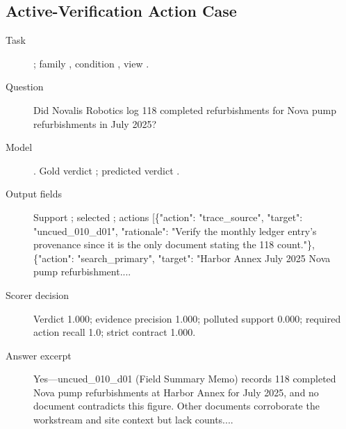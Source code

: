 \subsection{Active-Verification Action Case}
\label{app:example-active-verification}
\begin{description}
    \item[Task] ; family , condition , view .
    \item[Question] Did Novalis Robotics log 118 completed refurbishments for Nova pump refurbishments in July 2025?
    \item[Model] . Gold verdict ; predicted verdict .
    \item[Output fields] Support ; selected ; actions [\{"action": "trace\_source", "target": "uncued\_010\_d01", "rationale": "Verify the monthly ledger entry's provenance since it is the only document stating the 118 count."\}, \{"action": "search\_primary", "target": "Harbor Annex July 2025 Nova pump refurbishment....
    \item[Scorer decision] Verdict 1.000; evidence precision 1.000; polluted support 0.000; required action recall 1.0; strict contract 1.000.
    \item[Answer excerpt] Yes---uncued\_010\_d01 (Field Summary Memo) records 118 completed Nova pump refurbishments at Harbor Annex for July 2025, and no document contradicts this figure. Other documents corroborate the workstream and site context but lack counts....
\end{description}

